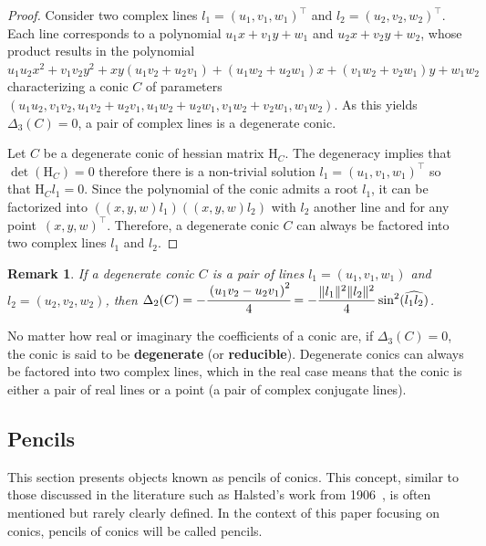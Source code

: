 \documentclass{birkjour}
\newtheorem{remark}{Remark}
\begin{document}
\begin{proof}
Consider two complex lines \(l_1 = (u_1, v_1, w_1)^\top\) and \(l_2 = (u_2, v_2, w_2)^\top\). Each line corresponds to a polynomial \(u_1 x + v_1 y + w_1\) and \(u_2 x + v_2 y + w_2\), whose product results in the polynomial  \(u_1u_2x^2+v_1v_2 y^2+ xy(u_1v_2+u_2v_1)+(u_1w_2+u_2w_1)x+(v_1w_2+v_2w_1) y+ w_1w_2\) characterizing a conic \(C\) of parameters \((u_1u_2, v_1v_2, u_1v_2+u_2v_1,u_1w_2+u_2w_1,v_1w_2+v_2w_1, w_1w_2)\). As this yields \(\Delta_3(C) = 0\), a pair of complex lines is a degenerate conic.

Let \(C\) be a degenerate conic of hessian matrix \(\mathrm{H}_C\). The degeneracy implies that \(\det(\mathrm{H}_C)=0\) therefore there is a non-trivial solution \(l_1=(u_1,v_1,w_1)^\top\) so that \(\mathrm{H}_C l_1 =0\). Since the polynomial of the conic admits a root \(l_1\), it can be factorized into \(\left((x,y,w) l_1\right) \left((x,y,w) l_2\right)\) with \(l_2\) another line and for any point~\((x,y,w)^\top\).%
Therefore, a degenerate conic \(C\) can always be factored into two complex lines \(l_1\) and \(l_2\).
\end{proof}

\begin{remark}
If a degenerate conic \(C\) is a pair of lines \(l_1 = (u_1, v_1, w_1)\) and \(l_2 = (u_2,v_2,w_2)\), then \(\displaystyle\Delta_2(C) = -\cfrac{\left(u_1v_2-u_2v_1\right)^2}{4} = -\frac{\|l_1\|^2\|l_2\|^2}{4}\sin^2(\widehat{l_1l_2})\).
\end{remark}

No matter how real or imaginary the coefficients of a conic are, if \(\Delta_3(C)=0\), the conic is said to be \textbf{degenerate} (or \textbf{reducible}). Degenerate conics can always be factored into two complex lines, which in the real case means that the conic is either a pair of real lines or a point (a pair of complex conjugate lines).


\subsection{Pencils}
This section presents objects known as pencils of conics. This concept, similar to those discussed in the literature such as Halsted's work from 1906~\cite{halsted_synthetic_1906}, is often mentioned but rarely clearly defined.
In the context of this paper focusing on conics, pencils of conics will be called pencils.
\end{document}
